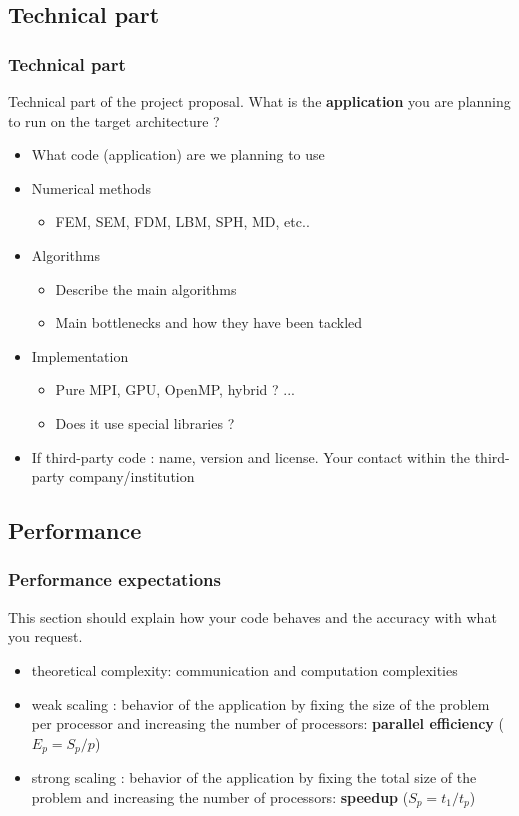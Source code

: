 \subsection{Technical part}

\begin{frame}[containsverbatim]
	\frametitle{Technical part}

Technical part of the project proposal. What is the \textbf{application} you are planning to run on the target architecture ?

\begin{itemize}
	\item{What code (application) are we planning to use }
	\item{Numerical methods
		\begin{itemize}
			\item{ FEM, SEM, FDM, LBM, SPH, MD, etc..}
		\end{itemize}
	}
	\item{Algorithms
		\begin{itemize}
			\item{ Describe the main algorithms}
			\item{ Main bottlenecks and how they have been tackled}
		\end{itemize}
	}
	\item{Implementation 
		\begin{itemize}
			\item{ Pure MPI, GPU, OpenMP, hybrid ? ...}
			\item{ Does it use special libraries ? }
		\end{itemize}
	}
	\item{If third-party code : name, version and license. Your contact within the third-party company/institution}
\end{itemize}
\end{frame}





\subsection{Performance}


\begin{frame}[containsverbatim]
	\frametitle{Performance expectations}

This section should explain how your code behaves and the accuracy with what you request.

\begin{itemize}
	\item { theoretical complexity: communication and computation complexities }
	\item { weak scaling : behavior of the application by fixing the size of the problem per processor and increasing the number of processors: \textbf{parallel efficiency} ($E_p = S_p/p$) }
	\item { strong scaling : behavior of the application by fixing the total size of the problem and increasing the number of processors: \textbf{speedup} ($S_p = t_1/t_p$) }
\end{itemize}
\end{frame}


